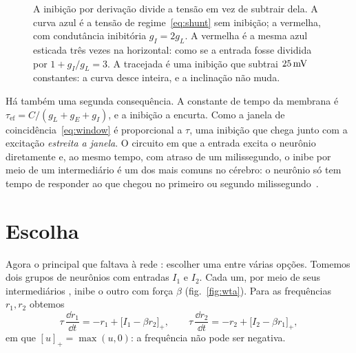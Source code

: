 \begin{figure}[t]
\centering
{}
\caption{A inibição por derivação divide a tensão em vez de subtrair dela. A curva azul é a tensão de regime~\eqref{eq:shunt} sem inibição; a vermelha, com condutância inibitória $g_I=2g_L$. A vermelha é a mesma azul esticada três vezes na horizontal: como se a entrada fosse dividida por $1+g_I/g_L=3$. A tracejada é uma inibição que subtrai $25\,\text{mV}$ constantes: a curva desce inteira, e a inclinação não muda.}
\label{fig:shunt}
\end{figure}

Há também uma segunda consequência. A constante de tempo da membrana é $\tau_{\text{ef}}=C/(g_L+g_E+g_I)$, e a inibição a encurta. Como a janela de coincidência~\eqref{eq:window} é proporcional a $\tau$, uma inibição que chega junto com a excitação \emph{estreita a janela}. O circuito em que a entrada excita o neurônio diretamente e, ao mesmo tempo, com atraso de um milissegundo, o inibe por meio de um intermediário  é um dos mais comuns no cérebro: o neurônio só tem tempo de responder ao que chegou no primeiro ou segundo milissegundo~\cite{Pouille2001}.

\section{Escolha}

Agora o principal que faltava à rede : escolher uma entre várias opções. Tomemos dois grupos de neurônios  com entradas $I_1$ e $I_2$. Cada um, por meio de seus intermediários , inibe o outro com força $\beta$ (fig.~\ref{fig:wta}). Para as frequências $r_1,r_2$ obtemos
\begin{equation}
\tau\,\frac{\dd r_1}{\dd t} = -r_1 + \bigl[I_1-\beta r_2\bigr]_+ ,\qquad
\tau\,\frac{\dd r_2}{\dd t} = -r_2 + \bigl[I_2-\beta r_1\bigr]_+ ,
\label{eq:wta}
\end{equation}
em que $[u]_+=\max(u,0)$: a frequência não pode ser negativa.

